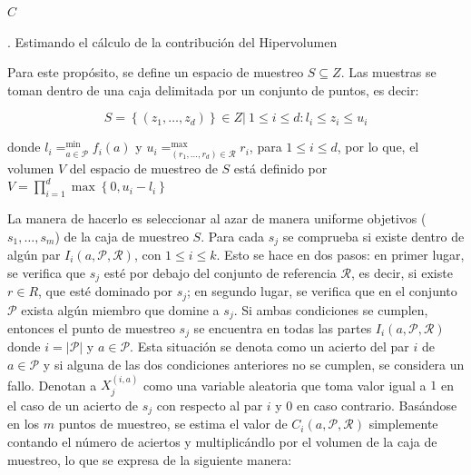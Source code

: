 \begin{algorithm}
\begin{algorithmic}[1]
{						}\DIFaddend \ENDIF						
					\ENDFOR
						\STATE \DIFdelbegin {}\DIFdelend \DIFaddbegin {}\DIFaddend \ENDIF
			\ENDIF 
		\ENDFOR
	\STATE \DIFdelbegin {}\DIFdelend \DIFaddbegin {}\DIFaddend \RETURN $C$
\end{algorithmic}
\caption[$hypeSampling$]{\DIFdelbegin {}\DIFdelend \DIFaddbegin {}\DIFaddend . Estimando el c\'alculo de la contribuci\'on del Hipervolumen}
\label{alg:hvaprox} 
\end{algorithm}

  Para este prop\'osito, se define un espacio de muestreo $S \subseteq Z$. Las muestras se toman dentro de una caja 
  delimitada por un conjunto de puntos, es decir:

  \[S = \left\{\left(z_1, \ldots, z_d \right) \right\} \in Z | \ 1 \leq i \leq d: l_i \leq z_i \leq u_i\]

  \DIFdelbegin %
\DIFdelend donde $l_i = ^{\min}_{a\in \mathcal{P}} f_i\left(a \right)$ y $u_i = ^{\max}_{\left(r_1, \ldots, r_d\right)\in \mathcal{R}} r_i$, para
  $1 \leq i \leq d$, por lo que, el volumen $V$ del espacio de muestreo de $S$ est\'a definido por 
  $V = \prod^{d}_{i=1}{\max\left\{0, u_i - l_i \right\}}$ 
  \DIFdelbegin {}%
\DIFdelend 

  La manera de hacerlo es seleccionar al azar de manera uniforme \DIFdelbegin {}\DIFdelend \DIFaddbegin {}\DIFaddend objetivos ($s_1, \ldots, s_m$) de la caja de muestreo $S$. 
  Para cada $s_j$ se comprueba si existe dentro de alg\'un par $I_i\left(a,\mathcal{P},\mathcal{R} \right)$, con
  $1 \leq i \leq k$. Esto se hace en dos pasos: en primer lugar, se verifica que $s_j$ est\'e por debajo del conjunto de 
  referencia $\mathcal{R}$, es decir, si existe $r \in R$, que est\'e dominado por $s_j$; en segundo lugar, se 
  verifica que en el conjunto $\mathcal{P}$ exista alg\'un miembro que domine a $s_j$. Si ambas condiciones se cumplen, 
  entonces el punto de muestreo $s_j$ se encuentra en todas las partes $I_i\left(a,\mathcal{P},\mathcal{R} \right)$
  donde $i=|\mathcal{P}|$ y $a \in \mathcal{P}$. Esta situaci\'on se denota como un acierto del par $i$ de $a \in \mathcal{P}$ y si 
  alguna de las dos condiciones anteriores no se cumplen, se considera un fallo. Denotan a $X^{\left(i, a\right)}_{j}$ como una variable 
  aleatoria que toma valor igual a $1$ en el caso de un acierto de  $s_j$ con respecto al par $i$ y $0$ en caso contrario. Bas\'andose 
  en los $m$ puntos de muestreo, se estima el valor de $C_i\left(a, \mathcal{P},\mathcal{R} \right)$ simplemente contando el 
  n\'umero de aciertos y multiplic\'andlo por el volumen de la caja de muestreo, lo que se expresa de la siguiente manera:


